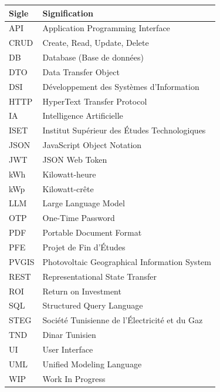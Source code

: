 
\tableofcontents
\cleardoublepage

\listoffigures
{}
\cleardoublepage

\listoftables
{}
\cleardoublepage

\thispagestyle{fancy}

\vspace*{-0.5cm}
{\small
\setlength{\tabcolsep}{8pt}
\renewcommand{\arraystretch}{1.1}

\begin{tabular}{p{1.8cm} p{11cm}}
\toprule
\textbf{Sigle} & \textbf{Signification} \\
\midrule
API    & Application Programming Interface \\
CRUD   & Create, Read, Update, Delete \\
DB     & Database (Base de données) \\
DTO    & Data Transfer Object \\
DSI    & Développement des Systèmes d'Information \\
HTTP   & HyperText Transfer Protocol \\
IA     & Intelligence Artificielle \\
ISET   & Institut Supérieur des Études Technologiques \\
JSON   & JavaScript Object Notation \\
JWT    & JSON Web Token \\
kWh    & Kilowatt-heure \\
kWp    & Kilowatt-crête \\
LLM    & Large Language Model \\
OTP    & One-Time Password \\
PDF    & Portable Document Format \\
PFE    & Projet de Fin d'Études \\
PVGIS  & Photovoltaic Geographical Information System \\
REST   & Representational State Transfer \\
ROI    & Return on Investment \\
SQL    & Structured Query Language \\
STEG   & Société Tunisienne de l'Électricité et du Gaz \\
TND    & Dinar Tunisien \\
UI     & User Interface \\
UML    & Unified Modeling Language \\
WIP    & Work In Progress \\
\bottomrule
\end{tabular}
}

\cleardoublepage
